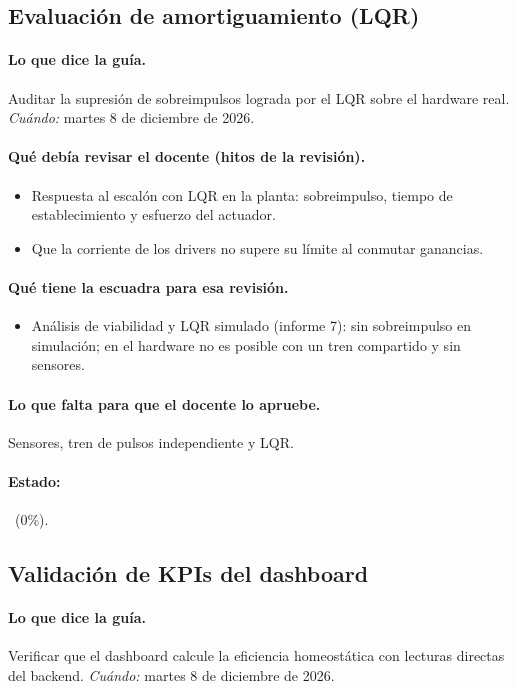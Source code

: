 \documentclass[a4paper,11pt]{article}
\begin{document}
\subsection{Evaluación de amortiguamiento (LQR)}
\paragraph{Lo que dice la guía.} Auditar la supresión de sobreimpulsos lograda por el LQR sobre el hardware real. \textit{Cuándo:} martes 8 de diciembre de 2026.
\paragraph{Qué debía revisar el docente (hitos de la revisión).}
\begin{itemize}
\item[$\square$] Respuesta al escalón con LQR en la planta: sobreimpulso, tiempo de establecimiento y esfuerzo del actuador.
\item[$\square$] Que la corriente de los drivers no supere su límite al conmutar ganancias.
\end{itemize}
\paragraph{Qué tiene la escuadra para esa revisión.}
\begin{itemize}
\item Análisis de viabilidad y LQR simulado (informe 7): sin sobreimpulso en simulación; en el hardware no es posible con un tren compartido y sin sensores.
\end{itemize}
\paragraph{Lo que falta para que el docente lo apruebe.} Sensores, tren de pulsos independiente y LQR.
\paragraph{Estado:} \falta~(0\%).
\subsection{Validación de KPIs del dashboard}
\paragraph{Lo que dice la guía.} Verificar que el dashboard calcule la eficiencia homeostática con lecturas directas del backend. \textit{Cuándo:} martes 8 de diciembre de 2026.
\end{document}
